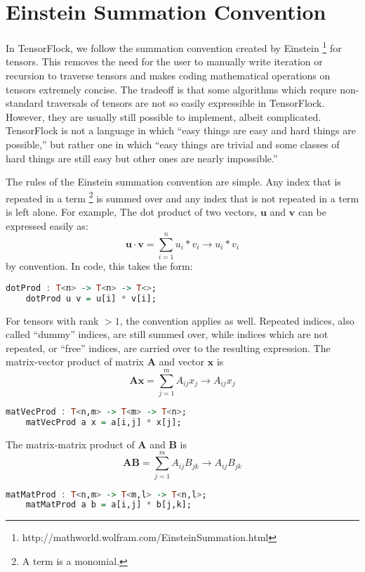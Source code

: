 \section{Einstein Summation Convention}%
\label{sec:einstein_summation_convention}

In TensorFlock, we follow the summation convention created by Einstein
\footnote{http://mathworld.wolfram.com/EinsteinSummation.html} 
for tensors. This removes the need for the user to manually write iteration or
recursion to traverse tensors and makes coding mathematical operations on
tensors extremely concise. The tradeoff is that some algorithms which requre
non-standard traversals of tensors are not so easily expressible in
TensorFlock. However, they are usually still possible to implement, albeit
complicated. TensorFlock is not a language in which ``easy things are easy and
hard things are possible,'' but rather one in which ``easy things are trivial
and some classes of hard things are still easy but other ones are nearly
impossible.''

The rules of the Einstein summation convention are simple. 
Any index that is repeated in a term \footnote{A term is a monomial.}  
is summed over and any index that is not repeated in a term is left alone.
For example, The dot product of two vectors, $\mathbf{u}$ and $\mathbf{v}$
can be expressed easily as: 
\[\mathbf{u} \cdot \mathbf{v} = \sum^{n}_{i=1} u_i * v_i \rightarrow u_i * v_i\] by
convention. In code, this takes the form:
\begin{lstlisting}[language=haskell]
    dotProd : T<n> -> T<n> -> T<>;
    dotProd u v = u[i] * v[i];
\end{lstlisting}

For tensors with rank $> 1$, the convention applies as well. Repeated indices,
also called ``dummy'' indices, are still summed over, while indices which are
not repeated, or ``free'' indices, are carried over to the resulting
expression. The matrix-vector product of matrix $\mathbf{A}$ and vector
$\mathbf{x}$ is  
\[ \mathbf{A} \mathbf{x} = \sum^{m}_{j=1} A_{ij} x_j \rightarrow A_{ij} x_j \]
\begin{lstlisting}[language=haskell]
    matVecProd : T<n,m> -> T<m> -> T<n>;
    matVecProd a x = a[i,j] * x[j];
\end{lstlisting}

The matrix-matrix product of $ \mathbf{A} $ and $ \mathbf{B} $ is 
\[ \mathbf{A} \mathbf{B} = \sum^{m}_{j=1} A_{ij} B_{jk} 
   \rightarrow A_{ij} B_{jk} \]
\begin{lstlisting}[language=haskell]
    matMatProd : T<n,m> -> T<m,l> -> T<n,l>;
    matMatProd a b = a[i,j] * b[j,k];
\end{lstlisting}

